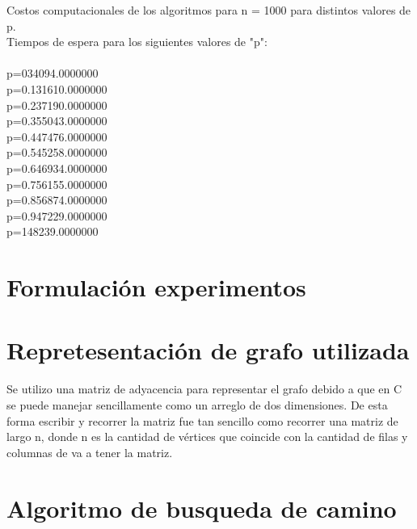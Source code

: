 \documentclass[12pt,letterpaper]{scrartcl}
\begin{document}
Costos computacionales de los algoritmos para n = 1000 para distintos valores de p.
\\
Tiempos de espera para los siguientes valores de "p":
\\\\
p=0\hspace{1cm}34094.0000000
\\
p=0.1\hspace{1cm}31610.0000000
\\
p=0.2\hspace{1cm}37190.0000000
\\
p=0.3\hspace{1cm}55043.0000000
\\
p=0.4\hspace{1cm}47476.0000000
\\
p=0.5\hspace{1cm}45258.0000000
\\
p=0.6\hspace{1cm}46934.0000000
\\
p=0.7\hspace{1cm}56155.0000000
\\
p=0.8\hspace{1cm}56874.0000000
\\
p=0.9\hspace{1cm}47229.0000000
\\
p=1\hspace{1cm}48239.0000000


\newpage
\section{Formulación experimentos}

\section{Repretesentación de grafo utilizada}

Se utilizo una matriz de adyacencia para representar el grafo debido a que en C se puede manejar sencillamente como un arreglo de dos dimensiones. De esta forma escribir y recorrer la matriz fue tan sencillo como recorrer una matriz de largo n, donde n es la cantidad de vértices que coincide con la cantidad de filas y columnas de va a tener la matriz.

\section{Algoritmo de busqueda de camino}
\end{document}
